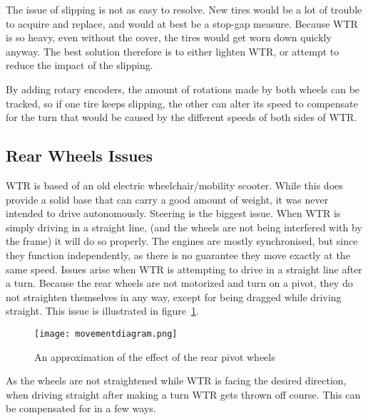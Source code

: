 The issue of slipping is not as easy to resolve.
New tires would be a lot of trouble to acquire and replace, and would at best be a stop-gap measure.
Because WTR is so heavy, even without the cover, the tires would get worn down quickly anyway.
The best solution therefore is to either lighten WTR, or attempt to reduce the impact of the slipping.

By adding rotary encoders, the amount of rotations made by both wheels can be tracked, so if one tire keeps slipping, the other can alter its speed to compensate for the turn that would be caused by the different speeds of both sides of WTR.


\subsection{Rear Wheels Issues}
WTR is based of an old electric wheelchair/mobility scooter.
While this does provide a solid base that can carry a good amount of weight, it was never intended to drive autonomously.
Steering is the biggest issue.
When WTR is simply driving in a straight line, (and the wheels are not being interfered with by the frame) it will do so properly.
The engines are mostly synchronised, but since they function independently, as there is no guarantee they move exactly at the same speed.
Issues arise when WTR is attempting to drive in a straight line after a turn.
Because the rear wheels are not motorized and turn on a pivot, they do not straighten themselves in any way, except for being dragged while driving straight.
This issue is illustrated in figure~\ref{fig::mvmnt}.

\begin{figure}[H]

\texttt{[image: movementdiagram.png]}
\caption{An approximation of the effect of the rear pivot wheels}
\label{fig::mvmnt}
\end{figure}
As the wheels are not straightened while WTR is facing the desired direction, when driving straight after making a turn WTR gets thrown off course.
This can be compensated for in a few ways.

